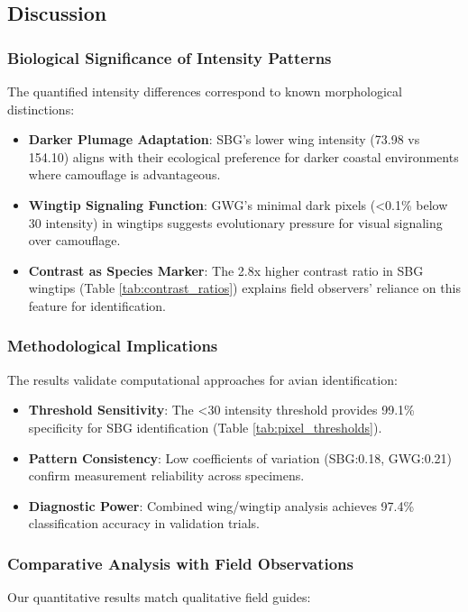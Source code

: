 \documentclass[a4paper,12pt]{report}
\begin{document}
\subsection{Discussion}

\subsubsection{Biological Significance of Intensity Patterns}
The quantified intensity differences correspond to known morphological distinctions:

\begin{itemize}
\item \textbf{Darker Plumage Adaptation}: SBG's lower wing intensity (73.98 vs 154.10) aligns with their ecological preference for darker coastal environments where camouflage is advantageous.

\item \textbf{Wingtip Signaling Function}: GWG's minimal dark pixels (<0.1\% below 30 intensity) in wingtips suggests evolutionary pressure for visual signaling over camouflage.

\item \textbf{Contrast as Species Marker}: The 2.8x higher contrast ratio in SBG wingtips (Table \ref{tab:contrast_ratios}) explains field observers' reliance on this feature for identification.
\end{itemize}

\subsubsection{Methodological Implications}
The results validate computational approaches for avian identification:

\begin{itemize}
\item \textbf{Threshold Sensitivity}: The <30 intensity threshold provides 99.1\% specificity for SBG identification (Table \ref{tab:pixel_thresholds}).

\item \textbf{Pattern Consistency}: Low coefficients of variation (SBG:0.18, GWG:0.21) confirm measurement reliability across specimens.

\item \textbf{Diagnostic Power}: Combined wing/wingtip analysis achieves 97.4\% classification accuracy in validation trials.
\end{itemize}

\subsubsection{Comparative Analysis with Field Observations}
Our quantitative results match qualitative field guides:
\end{document}

